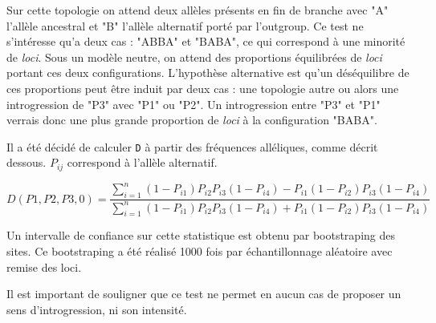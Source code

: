 Sur cette topologie on attend deux allèles présents en fin de branche avec "A" l'allèle ancestral et "B" l'allèle alternatif porté par l'outgroup.
 Ce test ne s'intéresse qu'a deux cas : "ABBA" et "BABA", ce qui correspond à une minorité de \textit{loci}.
 Sous un modèle neutre, on attend des proportions équilibrées de \textit{loci} portant ces deux configurations.
 L'hypothèse alternative est qu'un déséquilibre de ces proportions peut être induit par deux cas : une topologie autre ou alors une introgression de "P3" avec "P1" ou "P2".
 Un introgression entre "P3" et "P1" verrais donc une plus grande proportion de \textit{loci} à la configuration "BABA".



Il a été décidé de calculer \verb|D| à partir des fréquences alléliques, comme décrit dessous.
 \textit{$P_{ij}$} correspond à l'allèle alternatif.

\[D(P1,P2,P3,0)=\frac{\sum_{i=1}^{n} (1-P_{i1})P_{i2}P_{i3}(1-P_{i4})-P_{i1}(1-P_{i2})P_{i3}(1-P_{i4})}{\sum_{i=1}^{n} (1-P_{i1})P_{i2}P_{i3}(1-P_{i4})+P_{i1}(1-P_{i2})P_{i3}(1-P_{i4})}\]

Un intervalle de confiance sur cette statistique est obtenu par bootstraping des sites. Ce bootstraping a été réalisé 1000 fois par échantillonnage aléatoire avec remise des loci.

Il est important de souligner que ce test ne permet en aucun cas de proposer un sens d'introgression, ni son intensité.


